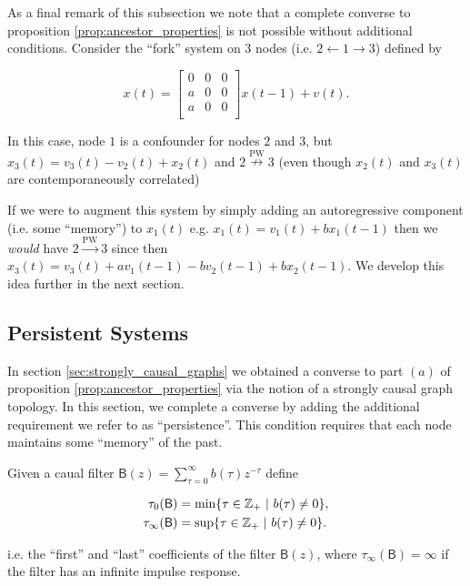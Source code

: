 \documentclass[12pt]{article}
\def\pwgc{\overset{\text{PW}}{\rightarrow}}  %
\def\npwgc{\overset{\text{PW}}{\nrightarrow}}  %
\def\B{\mathsf{B}}  %
\begin{document}
\begin{example}
  As a final remark of this subsection we note that a complete
  converse to proposition \ref{prop:ancestor_properties} is not
  possible without additional conditions.  Consider the ``fork'' system on $3$
  nodes (i.e. $2 \leftarrow 1 \rightarrow 3$) defined by

  \begin{equation*}
    x(t) =
    \left[
      \begin{array}{cccc}
        0 & 0 & 0\\
        a & 0 & 0\\
        a & 0 & 0\\
      \end{array}
    \right] x(t - 1) + v(t).
  \end{equation*}

  In this case, node $1$ is a confounder for nodes $2$ and $3$, but
  $x_3(t) = v_3(t) - v_2(t) + x_2(t)$ and $2 \npwgc 3$ (even
  though $x_2(t)$ and $x_3(t)$ are contemporaneously correlated)

  If we were to augment this system by simply adding an autoregressive
  component (i.e. some ``memory'') to $x_1(t)$ e.g.
  $x_1(t) = v_1(t) + b x_1(t - 1)$ then we \textit{would} have
  $2 \pwgc 3$ since then
  $x_3(t) = v_3(t) + av_1(t - 1) - bv_2(t - 1) + bx_2(t - 1)$.  We
  develop this idea further in the next section.
\end{example}

\subsection{Persistent Systems}
\label{sec:persistent_systems}
In section \ref{sec:strongly_causal_graphs} we obtained a converse to
part $(a)$ of proposition \ref{prop:ancestor_properties} via the
notion of a strongly causal graph topology.  In this section, we
complete a converse by adding the additional requirement we refer to
as ``persistence''.  This condition requires that each node maintains
some ``memory'' of the past.

\begin{definition}
  Given a caual filter $\B(z) = \sum_{\tau = 0}^\infty b(\tau)z^{-\tau}$
  define 

  \begin{align}
    \tau_0(\B) &= \text{min}\{\tau \in \Z_+\ |\ b(\tau) \ne 0\},\\
    \tau_{\infty}(\B) &= \text{sup}\{\tau \in \Z_+\ |\ b(\tau) \ne 0\}.\\
  \end{align}

  i.e. the ``first'' and ``last'' coefficients of the filter $\B(z)$,
  where $\tau_\infty(\B) = \infty$ if the filter has an infinite
  impulse response.
\end{definition}
\end{document}
